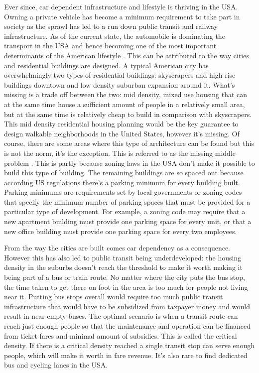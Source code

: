 \documentclass[
]{elteikthesis}[2023/04/10]
\begin{document}
Ever since, car dependent infrastructure and lifestyle is thriving
in the USA. Owning a private vehicle has become a minimum requirement
to take part in society as the sprawl has led to a run down public
transit and railway infrastructure. As of the current state, the automobile
is dominating the transport in the USA and hence becoming one of the
most important determinants of the American lifestyle \cite{pucher1996united}.
This can be attributed to the way cities and residential buildings
are designed. A typical American city has overwhelmingly two types
of residential buildings: skyscrapers and high rise buildings downtown
and low density suburban expansion around it. What's missing is a
trade off between the two: mid density, mixed use housing that can
at the same time house a sufficient amount of people in a relatively
small area, but at the same time is relatively cheap to build in comparison
with skyscrapers. This mid density residential housing planning would
be the key guarantee to design walkable neighborhoods in the United
States, however it's missing. Of course, there are some areas where
this type of architecture can be found but this is not the norm, it's
the exception. This is referred to as the missing middle problem \cite{parolek2020missing}.
This is partly because zoning laws in the USA don't make it possible
to build this type of building. The remaining buildings are so spaced
out because according US regulations there's a parking minimum for
every building built. Parking minimums are requirements set by local
governments or zoning codes that specify the minimum number of parking
spaces that must be provided for a particular type of development.
For example, a zoning code may require that a new apartment building
must provide one parking space for every unit, or that a new office
building must provide one parking space for every two employees.

From the way the cities are built comes car dependency as a consequence.
However this has also led to public transit being underdeveloped:
the housing density in the suburbs doesn't reach the threshold to
make it worth making it being part of a bus or train route. No matter
where the city puts the bus stop, the time taken to get there on foot
in the area is too much for people not living near it. Putting bus
stops overall would require too much public transit infrastructure
that would have to be subsidized from taxpayer money and would result
in near empty buses. The optimal scenario is when a transit route
can reach just enough people so that the maintenance and operation
can be financed from ticket fares and minimal amount of subsidies.
This is called the critical density. If there is a critical density
reached a single transit stop can serve enough people, which will
make it worth in fare revenue. It's also rare to find dedicated bus
and cycling lanes in the USA. 
\end{document}
